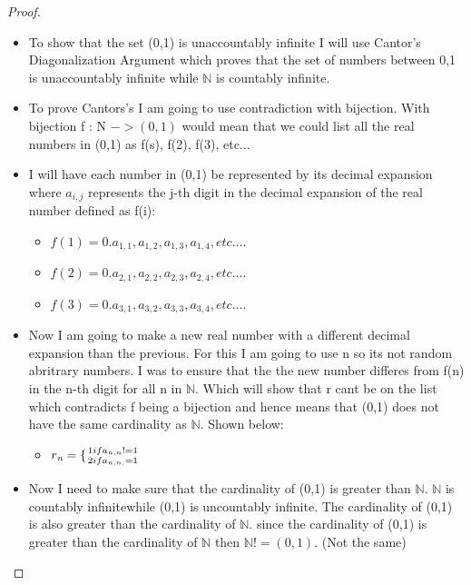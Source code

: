 \documentclass[10pt, AMS Euler]{article}
\newcommand{\N}{\mathbb{N}}
\begin{document}
\begin{enumerate}
\begin{proof}
\begin{itemize}
                        \begin{itemize}
                            \item To show that the set (0,1) is unaccountably infinite I will use Cantor's Diagonalization Argument which proves that the set of numbers between 0,1 is unaccountably infinite while $\N$ is countably infinite. 
                            \item To prove Cantors's I am going to use contradiction with bijection. With bijection f : N $-> (0,1)$ would mean that we could list all the real numbers in (0,1) as f(s), f(2), f(3), etc...
                            \item I will have each number in (0,1) be represented by its decimal expansion where $a_{i,j}$ represents the j-th digit in the decimal expansion of the real number defined as f(i):
                            \begin{itemize}
                                \item $f(1) = 0.a_{1,1}, a_{1,2}, a_{1,3}, a_{1,4}, etc....$
                                \item $f(2) = 0.a_{2,1}, a_{2,2}, a_{2,3}, a_{2,4}, etc....$
                                \item $f(3) = 0.a_{3,1}, a_{3,2}, a_{3,3}, a_{3,4}, etc....$
                            \end{itemize}
                            \item Now I am going to make a new real number with a different decimal expansion than the previous. For this I am going to use n so its not random abritrary numbers. I was to ensure that the the new number differes from f(n) in the n-th digit for all n in $\N$. Which will show that r cant be on the list which contradicts f being a bijection and hence means that (0,1) does not have the same cardinality as $\N$. Shown below:
                            \begin{itemize}
                                \item $r_{\emph{n}} = \{{1 if a_{n,n} != 1 \atop 2 if a_{n,n,} = 1}$
                            \end{itemize}
                            \item Now I need to make sure that the cardinality of (0,1) is greater than $\N$. $\N$ is countably infinitewhile (0,1) is uncountably infinite. The cardinality of (0,1) is also greater than the cardinality of $\N$. since the cardinality of (0,1) is greater than the cardinality of $\N$ then $\N != (0,1)$. (Not the same)

\end{itemize}
\end{itemize}
\end{proof}
\end{enumerate}
\end{document}
